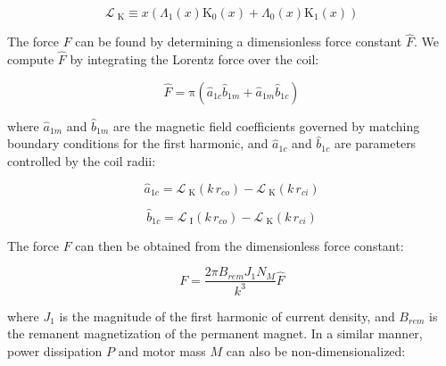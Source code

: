         \begin{equation}
            {\mathcal{L}_{{\textrm{ K}}}} \equiv x\left( {{\Lambda _1}\left( x \right){\mathrm{K}_0}\left( x \right) + {\Lambda _0}\left( x \right){\mathrm{K}_1}\left( x \right)} \right)
            \label{eq:bessel function 2}
        \end{equation}
        
        
        The force $F$ can be found by determining a dimensionless force constant $\hat F$. We compute $\hat F$ by integrating the Lorentz force over the coil:
        
        
        \begin{equation}
            \hat{F}=\mathrm\pi\left({\hat{a}}_{1c}{\hat{b}}_{1m}+{\hat{a}}_{1m}{\hat{b}}_{1c}\right)
            \label{eq:force dimless}
        \end{equation}
        
        
        where ${\hat a}_{1m}$ and ${\hat b}_{1m}$ are the magnetic field coefficients governed by matching boundary conditions for the first harmonic, and ${\hat a}_{1c}$ and ${\hat b}_{1c}$ are parameters controlled by the coil radii: 
        
        
        \begin{equation}
            \hat{a}_{1c}=\mathcal{L}_{\textrm{ K}}(k\,r_{co})-\mathcal{L}_{\textrm{ K}}(k\,r_{ci})
            \label{eq:a hat 1c}
        \end{equation}
        
        
        \begin{equation}
            \hat{b}_{1c}=\mathcal{L}_{\textrm{ I}}(k\,r_{co})-\mathcal{L}_{\textrm{ K}}(k\,r_{ci})
            \label{eq:b hat 1c}
        \end{equation}
        
        
        The force $F$ can then be obtained from the dimensionless force constant:
        
        
        \begin{equation}
            F = \frac{{2\pi {B_{rem}}{J_1}{N_M}}}{{{k^3}}}\hat F
            \label{eq:actual force}
        \end{equation}
        
        
        where $J_1$ is the magnitude of the first harmonic of current density, and $B_{rem}$ is the remanent magnetization of the permanent magnet. In a similar manner, power dissipation $P$ and motor mass $M$ can also be non-dimensionalized: 
        
